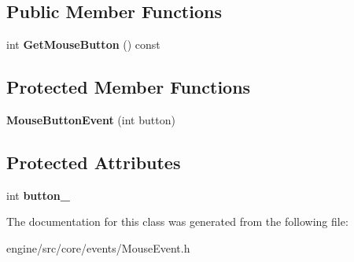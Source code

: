 \subsection*{Public Member Functions}
\begin{DoxyCompactItemize}
\item
\mbox{\label{classengine_1_1events_1_1MouseButtonEvent_ad6e5db5a8f746d3e0da996246f4df035}}
int {\bfseries Get\+Mouse\+Button} () const
\end{DoxyCompactItemize}
\subsection*{Protected Member Functions}
\begin{DoxyCompactItemize}
\item
\mbox{\label{classengine_1_1events_1_1MouseButtonEvent_af3ccd7fa769f0a383896c0d8faaca8a1}}
{\bfseries Mouse\+Button\+Event} (int button)
\end{DoxyCompactItemize}
\subsection*{Protected Attributes}
\begin{DoxyCompactItemize}
\item
\mbox{\label{classengine_1_1events_1_1MouseButtonEvent_ac8f03e2926022023b87a713cb44e85b7}}
int {\bfseries button\+\_\+}
\end{DoxyCompactItemize}


The documentation for this class was generated from the following file\+:\begin{DoxyCompactItemize}
\item
engine/src/core/events/Mouse\+Event.\+h\end{DoxyCompactItemize}
